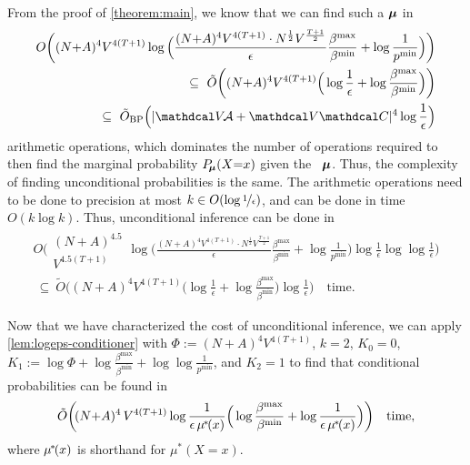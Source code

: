 \begin{subappendices}
\begin{lproof}
    From the proof of \cref{theorem:main}, we know that we can find
    such a $\boldsymbol\mu$ 
    in
    \begin{align*}
        O\bigg( 
            (N{+}A)^4 V^{4(T+1)}
            \log \Big( \frac{(N{+}A)^4 V^{4(T+1)}\cdot N^{\frac12} V^{\frac{T+1}{2}}}{\epsilon} \frac{\beta^{\max}}{\beta^{\min}} + \log \frac1{p^{\min}} \Big) 
        \bigg) \\
        ~\subseteq~
        \tilde O\bigg( 
            (N{+}A)^4 V^{4(T+1)}
            \Big(
            \log \frac1\epsilon + \log \frac{\beta^{\max}}{\beta^{\min}}\Big) 
        \bigg) \\
        ~\subseteq~
        \tilde O_{\text{BP}}\Big(|\V\!\Ar + \V \C|^{4}\log \frac{1}{\epsilon} \Big)
    \end{align*}
    arithmetic operations,
    which dominates the number of operations required to then find the marginal probability $P_{\!\boldsymbol\mu}(X{=}x)$ given the \actree\ $\boldsymbol\mu$.
    Thus, the complexity of finding unconditional probabilities is the same. 
    The arithmetic operations need to be done to precision at most $k \in O(\log\nicefrac1\epsilon)$, and can be done in time $O(k\log k)$. 
    Thus, unconditional inference can be done in 
    \begin{align*}
        O\bigg( 
            \begin{matrix}{}(N{+}A)^{4.5} \\ V^{4.5(T+1)}\end{matrix}
            \log \Big( \frac{(N{+}A)^4 V^{4(T+1)}\cdot N^{\frac12} V^{\frac{T+1}{2}}}{\epsilon} \frac{\beta^{\max}}{\beta^{\min}} + \log \frac1{p^{\min}} \Big) 
            \log\frac{1}{\epsilon} \log\log\frac{1}{\epsilon}
        \bigg) \\
        ~\subseteq~
        \tilde O\bigg( 
            (N{+}A)^4 V^{4(T+1)}
            \Big(
            \log \frac1\epsilon + \log \frac{\beta^{\max}}{\beta^{\min}}\Big) 
            \log \frac1\epsilon
        \bigg)
        \quad\text{time}. 
    \end{align*}
    
    \def\mustar{\mu^{\mskip-2mu*\!}}
    Now that we have characterized the cost of unconditional inference, we can apply \cref{lem:logeps-conditioner} with $\Phi := (N+A)^4 V^{4(T+1)}$,
    $k = 2$,
    $K_0 = 0$, 
    $K_1 := \log \Phi + \log \frac{\beta^{\max}}{\beta^{\min}} + \log \log \frac1{p^{\min}}$, 
    and
    $K_2 = 1$
    to find that conditional probabilities can be found in
    \begin{align*}
        \tilde O \bigg(\! (N{+}A)^4\,V^{4(T+1)} 
        \log \frac1{\epsilon\,\mustar(x)}
        \Big(
              \log \frac{\beta^{\max}}{\beta^{\min}} 
               + \log \frac1{\epsilon\, \mustar(x)} 
         \Big)\bigg) 
        \quad \text{time},
    \end{align*}
    where $\mustar(x)$ is shorthand for
    $\mu^*(X{=}x)$. 
\end{lproof}


\end{subappendices}
